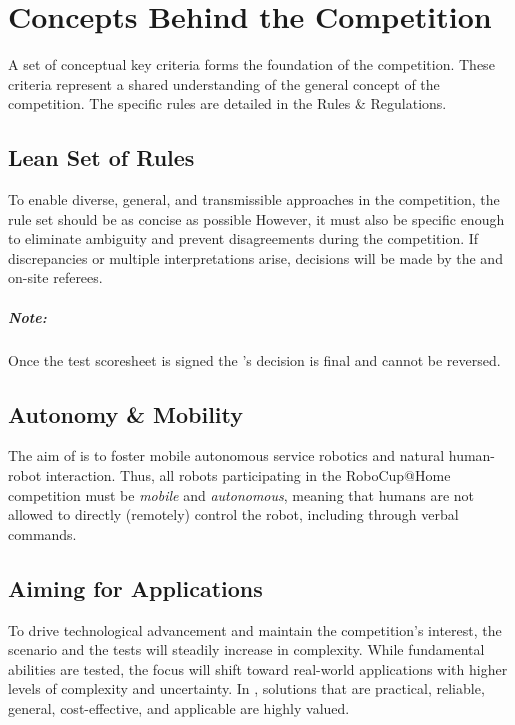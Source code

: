 \chapter{Concepts Behind the Competition}\label{chap:concepts}

A set of conceptual key criteria forms the foundation of the \textsc{\AtHome{}} competition.
These criteria represent a shared understanding of the general concept of the competition.
The specific rules are detailed in the \AtHome{} Rules \& Regulations.

\section{Lean Set of Rules}\label{concept:lean_set_of_rules}

To enable diverse, general, and transmissible approaches in the \AtHome{} competition, the rule set should be as concise as possible
However, it must also be specific enough to eliminate ambiguity and prevent disagreements during the competition.
If discrepancies or multiple interpretations arise, decisions will be made by the \TC{} and on-site referees.

\paragraph*{Note:} Once the test scoresheet is signed the \TC{}'s decision is final and cannot be reversed.

\section{Autonomy \& Mobility}\label{concept:autonomy_and_mobility}

The aim of \AtHome{} is to foster mobile autonomous service robotics and natural human-robot interaction.
Thus, all robots participating in the RoboCup@Home competition must be \emph{mobile} and \emph{autonomous}, meaning that humans are not allowed to directly (remotely) control the robot, including through verbal commands.

\section{Aiming for Applications}\label{concept:aiming_for_applications}

To drive technological advancement and maintain the competition's interest, the scenario and the tests will steadily increase in complexity.
While fundamental abilities are tested, the focus will shift toward real-world applications with higher levels of complexity and uncertainty.
In \AtHome{}, solutions that are practical, reliable, general, cost-effective, and applicable are highly valued.

